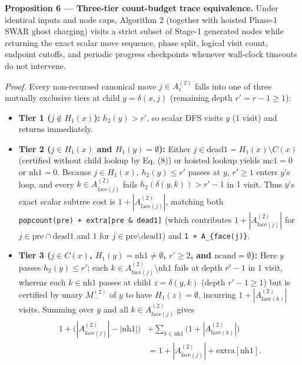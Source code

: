 \documentclass[10pt,twocolumn,letterpaper]{article}
\providecommand{\tightlist}{\setlength{\itemsep}{0pt}\setlength{\parskip}{0pt}}
\begin{document}
\textbf{Proposition 6 --- Three-tier count-budget trace equivalence.}
Under identical inputs and node caps, Algorithm 2 (together with hoisted
Phase-1 SWAR ghost charging) visits a strict subset of Stage-1 generated
nodes while returning the exact scalar move sequence, phase split,
logical visit count, endpoint cutoffs, and periodic progress checkpoints
whenever wall-clock timeouts do not intervene.

\emph{Proof.} Every non-recursed canonical move \(j \in A_\ell^{(2)}\)
falls into one of three mutually exclusive tiers at child
\(y = \delta(x,j)\) (remaining depth \(r' = r - 1 \ge 1\)):

\begin{itemize}
\tightlist
\item
  \textbf{Tier 1 (\(j \notin H_1(x)\)):} \(h_2(y) > r'\), so scalar DFS
  visits \(y\) (\(1\) visit) and returns immediately.
\item
  \textbf{Tier 2 (\(j \in H_1(x)\) and \(H_1(y) = \emptyset\)):} Either
  \(j \in \text{dead1} = H_1(x)\setminus C(x)\) (certified without child
  lookup by Eq. (8)) or hoisted lookup yields \(\text{mc1}=0\) or
  \(\text{nh1}=0\). Because \(j \in H_1(x)\), \(h_2(y) \le r'\) passes
  at \(y\), \(r' \ge 1\) enters \(y\)'s loop, and every
  \(k \in A_{\text{face}(j)}^{(2)}\) fails \(h_2(\delta(y,k)) > r'-1\)
  in \(1\) visit. Thus \(y\)'s exact scalar subtree cost is
  \(1 + |A_{\text{face}(j)}^{(2)}|\), matching both
  \texttt{popcount(pre)\ +\ extra{[}pre\ \&\ dead1{]}} (which
  contributes \(1 + |A_{\text{face}(j)}^{(2)}|\) for
  \(j \in \text{pre}\cap\text{dead1}\) and \(1\) for
  \(j \in \text{pre}\setminus\text{dead1}\)) and
  \texttt{1\ +\ \textbar{}A\_\{face(j)\}\textbar{}}.
\item
  \textbf{Tier 3 (\(j \in C(x)\), \(H_1(y) = \text{nh1} \ne \emptyset\),
  \(r' \ge 2\), and \(\text{ncand} = \emptyset\)):} Here \(y\) passes
  \(h_2(y) \le r'\); each
  \(k \in A_{\text{face}(j)}^{(2)} \setminus \text{nh1}\) fails at depth
  \(r'-1\) in \(1\) visit, whereas each \(k \in \text{nh1}\) passes at
  child \(z = \delta(y,k)\) (depth \(r'-1 \ge 1\)) but is certified by
  unary \(M_-^{(2)}\) of \(y\) to have \(H_1(z) = \emptyset\), incurring
  \(1 + |A_{\text{face}(k)}^{(2)}|\) visits. Summing over \(y\) and all
  \(k \in A_{\text{face}(j)}^{(2)}\) gives \[
  \begin{aligned}
  1 + \bigl(|A_{\text{face}(j)}^{(2)}| - |\text{nh1}|\bigr) &+ \sum_{k \in \text{nh1}} \bigl(1 + |A_{\text{face}(k)}^{(2)}|\bigr)\\
  &= 1 + |A_{\text{face}(j)}^{(2)}| + \text{extra}[\text{nh1}].
  \end{aligned}
  \tag{11}
  \]
\end{itemize}
\end{document}
